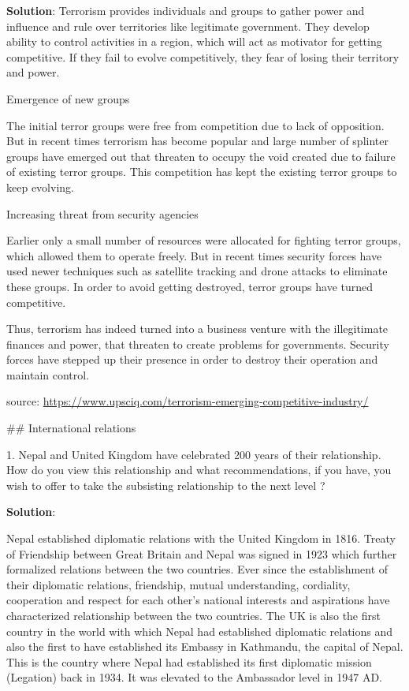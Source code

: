 \documentclass[
  openany]{book}
\newenvironment{solution}{ {\bfseries Solution}:}{}
\begin{document}
\begin{questions}
\begin{solution}
Terrorism provides individuals and groups to gather power and influence and rule over territories like legitimate government. They develop ability to control activities in a region, which will act as motivator for getting competitive. If they fail to evolve competitively, they fear of losing their territory and power.

Emergence of new groups

The initial terror groups were free from competition due to lack of opposition. But in recent times terrorism has become popular and large number of splinter groups have emerged out that threaten to occupy the void created due to failure of existing terror groups. This competition has kept the existing terror groups to keep evolving.

Increasing threat from security agencies

Earlier only a small number of resources were allocated for fighting terror groups, which allowed them to operate freely. But in recent times security forces have used newer techniques such as satellite tracking and drone attacks to eliminate these groups. In order to avoid getting destroyed, terror groups have turned competitive.

Thus, terrorism has indeed turned into a business venture with the illegitimate finances and power, that threaten to create problems for governments. Security forces have stepped up their presence in order to destroy their operation and maintain control.

source: \url{https://www.upsciq.com/terrorism-emerging-competitive-industry/}
\end{solution}

## International relations

1. Nepal and United Kingdom have celebrated 200 years of their relationship. How do you view this relationship and what recommendations, if you have, you wish to offer to take the subsisting relationship to the next level ?

\begin{solution}

Nepal established diplomatic relations with the United Kingdom in 1816. Treaty of Friendship between Great Britain and Nepal was signed in 1923 which further formalized relations between the two countries. Ever since the establishment of their diplomatic relations, friendship, mutual understanding, cordiality, cooperation and respect for each other's national interests and aspirations have characterized relationship between the two countries. The UK is also the first country in the world with which Nepal had established diplomatic relations and also the first to have established its Embassy in Kathmandu, the capital of Nepal. This is the country where Nepal had established its first diplomatic mission (Legation) back in 1934. It was elevated to the Ambassador level in 1947 AD.


\end{solution}
\end{questions}
\end{document}
